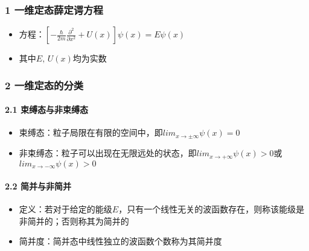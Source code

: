 \documentclass[UTF8,twocolumn]{ctexart}
\providecommand{\tightlist}{%
  \setlength{\itemsep}{0pt}\setlength{\parskip}{0pt}}
\let\oldparagraph\paragraph
\renewcommand{\paragraph}[1]{\oldparagraph{#1}\mbox{}}
\begin{document}
\hypertarget{ux4e00ux7ef4ux5b9aux6001ux859bux5b9aux8c14ux65b9ux7a0b}{%
\subsubsection{1
一维定态薛定谔方程}\label{ux4e00ux7ef4ux5b9aux6001ux859bux5b9aux8c14ux65b9ux7a0b}}

\begin{itemize}
\tightlist
\item
  方程：\([-\frac{\hbar}{2m}\frac{\partial^2}{\partial x^2}+U(x)]\psi(x)=E\psi(x)\)
\item
  其中\(E,\,U(x)\)均为实数
\end{itemize}

\hypertarget{ux4e00ux7ef4ux5b9aux6001ux7684ux5206ux7c7b}{%
\subsubsection{2
一维定态的分类}\label{ux4e00ux7ef4ux5b9aux6001ux7684ux5206ux7c7b}}

\hypertarget{ux675fux7f1aux6001ux4e0eux975eux675fux7f1aux6001}{%
\paragraph{{ }2.1
束缚态与非束缚态}\label{ux675fux7f1aux6001ux4e0eux975eux675fux7f1aux6001}}

\begin{itemize}
\tightlist
\item
  束缚态：粒子局限在有限的空间中，即\(lim_{x\to\pm\infty}\psi(x)=0\)
\item
  非束缚态：粒子可以出现在无限远处的状态，即\(lim_{x\to+\infty}\psi(x)>0\)或\(lim_{x\to-\infty}\psi(x)>0\)
\end{itemize}

\hypertarget{ux7b80ux5e76ux4e0eux975eux7b80ux5e76}{%
\paragraph{{ }2.2
简并与非简并}\label{ux7b80ux5e76ux4e0eux975eux7b80ux5e76}}

\begin{itemize}
\tightlist
\item
  定义：若对于给定的能级\(E\)，只有一个线性无关的波函数存在，则称该能级是非简并的；否则称其为简并的
\item
  简并度：简并态中线性独立的波函数个数称为其简并度
\end{itemize}
\end{document}
